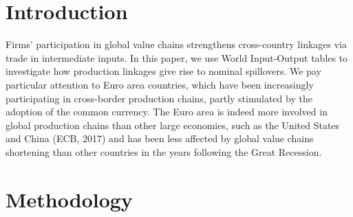 \documentclass[11pt,a4paper]{article}
\begin{document}
\section{Introduction}
Firms’ participation in global value chains strengthens cross-country linkages via trade in intermediate inputs. In this paper, we use World Input-Output tables to investigate how production linkages give rise to nominal spillovers. We pay particular attention to Euro area countries, which have been increasingly participating in cross-border production chains, partly stimulated by the adoption of the common currency. The Euro area is indeed more involved in global production chains than other large economies, such as the United States and China (ECB, 2017) and has been less affected by global value chains shortening than other countries in the years following the Great Recession. 
\label{sec:intro}



\section{Methodology }
\label{sec:metho}
\end{document}
